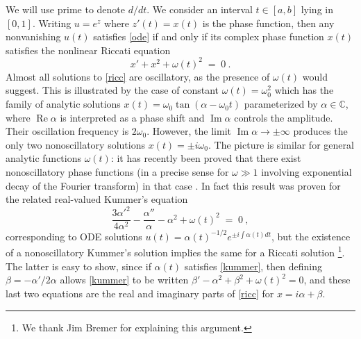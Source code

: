 \documentclass[10pt]{article}
\newcommand{\be}{\begin{equation}}
\newcommand{\ee}{\end{equation}}
\newcommand{\C}{\mathbb{C}}
\DeclareMathOperator{\im}{Im}
\DeclareMathOperator{\re}{Re}
\newcommand{\om}{\omega}
\begin{document}
We will use prime to denote $d/dt$.
We consider an interval $t\in[a,b]$ lying in $[0,1]$.
Writing $u = e^z$ where $z'(t) = x(t)$ is the phase function,
then any nonvanishing $u(t)$ satisfies \eqref{ode} if and only if
its complex phase function $x(t)$ satisfies the nonlinear Riccati equation
\be
x' + x^2 + \om(t)^2 \;=\; 0~.
\label{ricc}
\ee
Almost all solutions to \eqref{ricc} are oscillatory,
as the presence of $\om(t)$ would suggest.
This is illustrated by the case of constant $\om(t) = \om_0^2$
which has the family of analytic solutions
$x(t) = \om_0 \tan(\alpha - \om_0t)$ parameterized by $\alpha\in\C$,
where $\re \alpha$ is interpreted as a phase shift and $\im \alpha$
controls the amplitude. Their oscillation frequency is $2\om_0$.
However, the limit $\im \alpha \to \pm \infty$ produces
the only two nonoscillatory solutions $x(t) = \pm i\om_0$.
The picture is similar
for general analytic functions $\om(t)$:
it has recently been proved that there exist nonoscillatory phase functions
(in a precise sense for $\om\gg 1$ involving exponential decay of the Fourier
transform) in that case \cite{Heit15,Brem16}.
In fact this result was proven
for the related real-valued Kummer's equation
\be
\frac{3 \alpha'^2}{4\alpha^2} - \frac{\alpha''}{\alpha} - \alpha^2 +
\om(t)^2 \; = \; 0~,
\label{kummer}
\ee
corresponding to ODE solutions $u(t) = \alpha(t)^{-1/2} e^{\pm i\int \alpha(t) dt}$,
but the existence of a nonoscillatory Kummer's solution implies the same for
a Riccati solution \footnote{We thank Jim Bremer for explaining this argument.}.
The latter is easy to show, since if $\alpha(t)$ satisfies \eqref{kummer},
then defining $\beta = -\alpha'/2\alpha$ allows \eqref{kummer}
to be written
$\beta' - \alpha^2 + \beta^2 + \om(t)^2 = 0$, and these last two equations
are the real and imaginary parts of \eqref{ricc}
for $x = i\alpha + \beta$.
\end{document}
